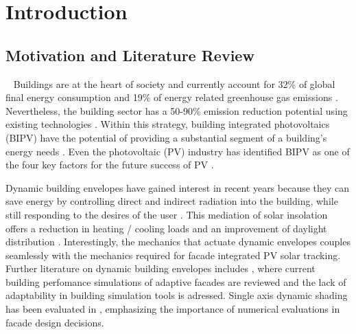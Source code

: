\chapter{Introduction}


\section{Motivation and Literature Review}\
\label{ch:motivation}
	Buildings are at the heart of society and currently account for 32\% of global final energy consumption and 19\% of energy related greenhouse gas emissions \cite{IPCC}. Nevertheless, the building sector has a 50-90\% emission reduction potential using existing technologies \cite{IPCC}. Within this strategy, building integrated photovoltaics (BIPV) have the potential of providing a substantial segment of a building's energy needs \cite{defaix2012technical}. Even the photovoltaic (PV) industry has identified BIPV as one of the four key factors for the future success of PV \cite{raugei2009life}. 



	Dynamic building envelopes have gained interest in recent years because they can save energy by controlling direct and indirect radiation into the building, while still responding to the desires of the user \cite{loonen2013climate}. This mediation of solar insolation offers a reduction in heating / cooling loads and an improvement of daylight distribution \cite{rossi2012adaptive}. Interestingly, the mechanics that actuate dynamic envelopes couples seamlessly with the mechanics required for facade integrated PV solar tracking. Further literature on dynamic building envelopes includes \cite{loonen16}, where current building perfomance simulations of adaptive facades are reviewed and the lack of adaptability in building simulation tools is adressed. Single axis dynamic shading has been evaluated in \cite{nielsen2011quantifying}, emphasizing the importance of numerical evaluations in facade design decisions. 

